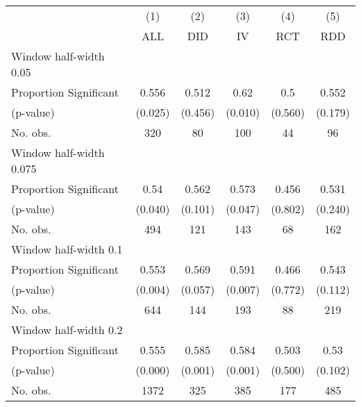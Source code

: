 
\def\sym#1{\ifmmode^{#1}\else\(^{#1}\)\fi}
\begin{tabular}{l*{5}{c}}
\hline\hline
& \multicolumn{1}{c}{(1)} &  \multicolumn{1}{c}{(2)} &  \multicolumn{1}{c}{(3)} &  \multicolumn{1}{c}{(4)} &  \multicolumn{1}{c}{(5)}\\
& \multicolumn{1}{c}{ALL} &  \multicolumn{1}{c}{DID} &  \multicolumn{1}{c}{IV} &  \multicolumn{1}{c}{RCT} &  \multicolumn{1}{c}{RDD}\\

\hline
\hline
Window half-width 0.05\\

Proportion Significant& 0.556 &  0.512 &  0.62 &  0.5 &  0.552\\

(p-value) & (0.025) &  (0.456) &  (0.010) &  (0.560) &  (0.179)\\

No. obs.& 320 &  80 &  100 &  44 &  96\\

\hline
Window half-width 0.075\\

Proportion Significant& 0.54 &  0.562 &  0.573 &  0.456 &  0.531\\

(p-value) & (0.040) &  (0.101) &  (0.047) &  (0.802) &  (0.240)\\

No. obs.& 494 &  121 &  143 &  68 &  162\\

\hline
Window half-width 0.1\\

Proportion Significant& 0.553 &  0.569 &  0.591 &  0.466 &  0.543\\

(p-value) & (0.004) &  (0.057) &  (0.007) &  (0.772) &  (0.112)\\

No. obs.& 644 &  144 &  193 &  88 &  219\\

\hline
Window half-width 0.2\\

Proportion Significant& 0.555 &  0.585 &  0.584 &  0.503 &  0.53\\

(p-value) & (0.000) &  (0.001) &  (0.001) &  (0.500) &  (0.102)\\

No. obs.& 1372 &  325 &  385 &  177 &  485\\


\end{tabular}
